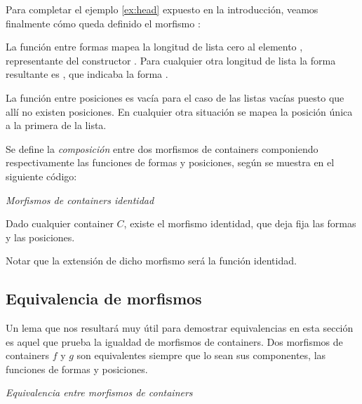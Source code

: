 \begin{example} Para completar el ejemplo \ref{ex:head} expuesto en la introducción, veamos finalmente cómo queda definido el morfismo :


La función entre formas mapea la longitud de lista cero al elemento , representante del constructor . Para cualquier otra longitud de lista la forma resultante es , que indicaba la forma .

La función entre posiciones es vacía para el caso de las listas vacías puesto que allí no existen posiciones. En cualquier otra situación se mapea la posición única  a la primera de la lista. 

\end{example}

\begin{definition}\label{code:morph:comp}Se define la {\it composición} entre dos morfismos de containers componiendo respectivamente las funciones de formas y posiciones, según se muestra en el siguiente código:
  
\end{definition}

\begin{example}\label{code:morph:id}{\it Morfismos de containers identidad}

Dado cualquier container $C$, existe el morfismo identidad, que deja fija las formas y las posiciones.
  
  Notar que la extensión de dicho morfismo será la función identidad.
\end{example}

\subsection{Equivalencia de morfismos}

Un lema que nos resultará muy útil para demostrar equivalencias en esta sección es aquel que prueba la igualdad de morfismos de containers. Dos morfismos de containers $f$ y $g$ son equivalentes siempre que lo sean sus componentes, las funciones de formas y posiciones.

\begin{agdacode}\label{morph:equivalence}{\it Equivalencia entre morfismos de containers}
  
\end{agdacode}

